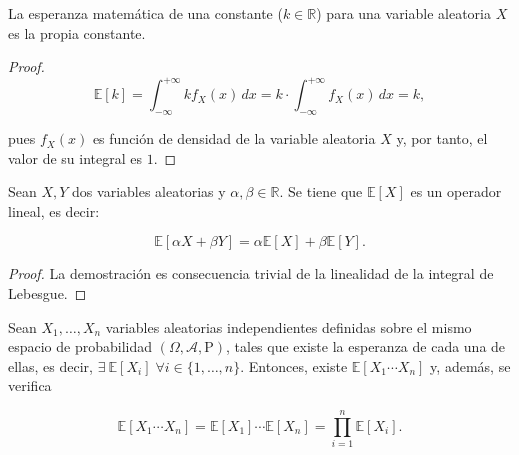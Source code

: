 \begin{proposicion}
    La esperanza matemática de una constante ($k \in \mathbb{R}$) para una variable aleatoria $X$ es la propia constante.
\end{proposicion}

\begin{proof}
    \[ \mathbb{E}[k] = \int_{-\infty}^{+\infty} k f_{X}(x) \, dx = k\cdot \int_{-\infty}^{+\infty} f_{X}(x) \, dx = k, \]

    pues $f_{X}(x)$ es función de densidad de la variable aleatoria $X$ y, por tanto, el valor de su integral es $1$.
\end{proof}

\begin{proposicion}
    Sean $X, Y$ dos variables aleatorias y $\alpha, \beta \in \mathbb{R}$. Se tiene que $\mathbb{E}[X]$ es un operador lineal, es decir:

    \[ \mathbb{E}[\alpha X + \beta Y] = \alpha\mathbb{E}[X] + \beta\mathbb{E}[Y]. \]
\end{proposicion}

\begin{proof}
    La demostración es consecuencia trivial de la linealidad de la integral de Lebesgue.
\end{proof}

\begin{teorema}
    Sean $X_1, \ldots, X_n$ variables aleatorias independientes definidas sobre el mismo espacio de probabilidad $(\Omega, \mathcal{A}, \mathrm{P})$, tales que existe la esperanza de cada una de ellas, es decir, $\exists \ \mathbb{E}[X_i] \; \forall i \in \{1, \ldots, n \}$. Entonces, existe $\mathbb{E}[X_1 \cdots X_n]$ y, además, se verifica

    \[ \mathbb{E}[X_1 \cdots X_n] = \mathbb{E}[X_1] \cdots \mathbb{E}[X_n] = \prod_{i=1}^n \mathbb{E}[X_i]. \]
\end{teorema}

